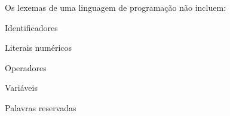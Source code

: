\question[10]

Os lexemas de uma linguagem de programação não incluem:

\begin{choices}
\item Identificadores
\item Literais numéricos
\item Operadores
\item Variáveis %
\item Palavras reservadas
\end{choices}
\answerline

